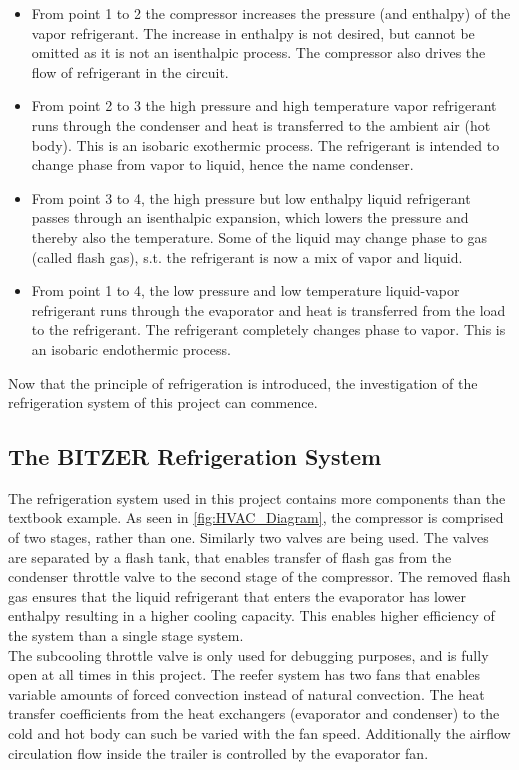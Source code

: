 \begin{itemize}
	\item From point 1 to 2 the compressor increases the pressure (and enthalpy) of the vapor refrigerant. The increase in enthalpy is not desired, but cannot be omitted as it is not an isenthalpic process. The compressor also drives the flow of refrigerant in the circuit.
	\item From point 2 to 3 the high pressure and high temperature vapor refrigerant runs through the condenser and heat is transferred to the ambient air (hot body). This is an isobaric exothermic process. The refrigerant is intended to change phase from vapor to liquid, hence the name condenser.
	\item From point 3 to 4, the high pressure but low enthalpy liquid refrigerant passes through an isenthalpic expansion, which lowers the pressure and thereby also the temperature. Some of the liquid may change phase to gas (called flash gas), s.t. the refrigerant is now a mix of vapor and liquid.
	\item From point 1 to 4, the low pressure and low temperature liquid-vapor refrigerant runs through the evaporator and heat is transferred from the load to the refrigerant. The refrigerant completely changes phase to vapor. This is an isobaric endothermic process. 
\end{itemize}
 Now that the principle of refrigeration is introduced, the investigation of the refrigeration system of this project can commence.
 
\subsection{The BITZER Refrigeration System}
The refrigeration system used in this project contains more components than the textbook example. As seen in \cref{fig:HVAC_Diagram}, the compressor is comprised of two stages, rather than one. Similarly two valves are being used. The valves are separated by a flash tank, that enables transfer of flash gas from the condenser throttle valve to the second stage of the compressor. The removed flash gas ensures that the liquid refrigerant that enters the evaporator has lower enthalpy resulting in a higher cooling capacity. This enables higher efficiency of the system than a single stage system.\\
The subcooling throttle valve is only used for debugging purposes, and is fully open at all times in this project. The reefer system has two fans that enables variable amounts of forced convection instead of natural convection. The heat transfer coefficients from the heat exchangers (evaporator and condenser) to the cold and hot body can such be varied with the fan speed. Additionally the airflow circulation flow inside the trailer is controlled by the evaporator fan.

